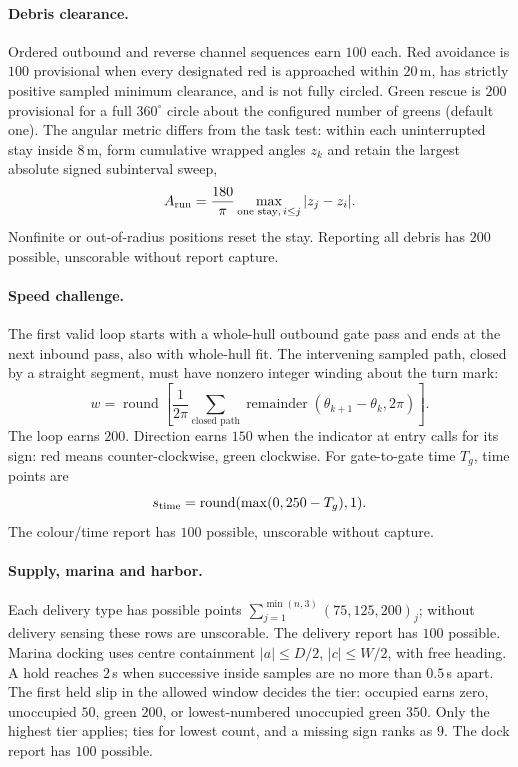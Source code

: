 \paragraph{Debris clearance.} Ordered outbound and reverse channel sequences
earn $100$ each. Red avoidance is $100$ provisional when every designated red
is approached within $20$\,m, has strictly positive sampled minimum clearance,
and is not fully circled. Green rescue is $200$ provisional for a full
$360^\circ$ circle about the configured number of greens (default one).
The angular metric differs from the task test: within each uninterrupted stay
inside $8$\,m, form cumulative wrapped angles $z_k$ and retain the largest
absolute signed subinterval sweep,
\[
 A_{\rm run}=\frac{180}{\pi}\max_{\text{one stay},\,i\le j}|z_j-z_i|.
\]
Nonfinite or out-of-radius positions reset the stay. Reporting all debris has
$200$ possible, unscorable without report capture.

\paragraph{Speed challenge.} The first valid loop starts with a whole-hull
outbound gate pass and ends at the next inbound pass, also with whole-hull fit.
The intervening sampled path, closed by a straight segment, must have nonzero
integer winding about the turn mark:
\[
 w=\operatorname{round}\!\left[\frac1{2\pi}
 \sum_{\text{closed path}}\operatorname{remainder}(\theta_{k+1}-\theta_k,2\pi)\right].
\]
The loop earns $200$. Direction earns $150$ when the indicator at entry calls
for its sign: red means counter-clockwise, green clockwise. For gate-to-gate
time $T_g$, time points are
\[
 s_{\rm time}=\operatorname{round}(\max(0,250-T_g),1).
\]
The colour/time report has $100$ possible, unscorable without capture.

\paragraph{Supply, marina and harbor.} Each delivery type has possible points
$\sum_{j=1}^{\min(n,3)}(75,125,200)_j$; without delivery sensing these rows are
unscorable. The delivery report has $100$ possible.
Marina docking uses centre containment $|a|\le D/2$, $|c|\le W/2$, with
free heading. A hold reaches $2$\,s when successive inside samples are no more
than $0.5$\,s apart. The first held slip in the allowed window decides the tier:
occupied earns zero, unoccupied $50$, green $200$, or lowest-numbered unoccupied
green $350$. Only the highest tier applies; ties for lowest count, and a missing
sign ranks as $9$. The dock report has $100$ possible.

